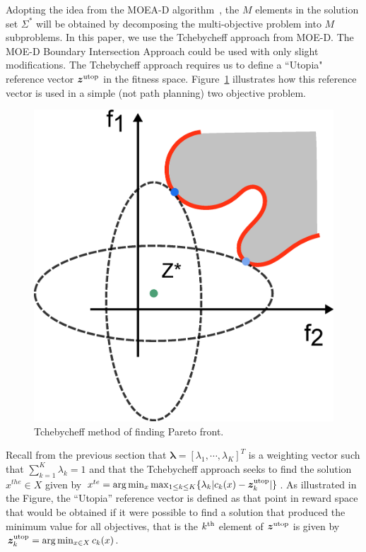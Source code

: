\documentclass{article}
\begin{document}
Adopting the idea from the MOEA-D algorithm~\cite{4358754}, the $M$ elements in the solution set $\Sigma^{*}$ will be obtained by decomposing the multi-objective problem into $ M $ subproblems.  
In this paper, we use the Tchebycheff approach from MOE-D. The MOE-D Boundary Intersection Approach could be used with only slight modifications. The Tchebycheff approach requires us to define a ``Utopia" reference vector $ \bm{z}^{\rm utop} $ in the fitness space. 
Figure~\ref{fig:Tchebycheff} illustrates how this reference vector is used in a simple (not path planning) two objective problem.  
\begin{figure}
\centering
\includegraphics[width=0.4\linewidth]{fig/Tchebycheff2.png}
\caption{Tchebycheff method of finding Pareto front.}
\label{fig:Tchebycheff}
\end{figure}
Recall from the previous section that  $ \bm{\lambda} = [ \lambda_{1} , \cdots , \lambda_{K}  ]^{T} $ is a weighting vector such that $ \sum_{k=1}^{K} \lambda_{k} = 1 $ and that the Tchebycheff approach seeks to find the solution $ x^{the}\in X $ given by $ x^{te} = \arg\min_x \max_{1 \leq k \leq K}  \{ \lambda_{k} | c_{k}(x) - \bm{z}^{\rm utop}_{k}  | \} $.  
As illustrated in the Figure, the ``Utopia'' reference vector is defined as that point in reward space that would be obtained if it were possible to find a solution that produced the minimum value for all objectives, that is the $k^{\rm th}$ element of $\bm{z}^{\rm utop}$ is given by $\bm{z}^{\rm utop}_{k} = \arg \min_{x \in X} c_{k}(x)$.  
\end{document}
